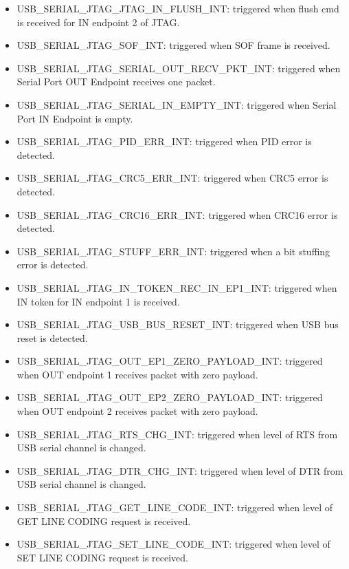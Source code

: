 \documentclass[main\_\_EN.tex]{subfiles}
\begin{document}
\begin{itemize}
    \item \label{int:USBSERIALJTAGJTAGINFLUSHINT}USB\_SERIAL\_JTAG\_JTAG\_IN\_FLUSH\_INT: triggered when flush cmd is received for IN endpoint 2 of JTAG.
    \item \label{int:USBSERIALJTAGSOFINT}USB\_SERIAL\_JTAG\_SOF\_INT: triggered when SOF frame is received.
    \item \label{int:USBSERIALJTAGSERIALOUTRECVPKTINT}USB\_SERIAL\_JTAG\_SERIAL\_OUT\_RECV\_PKT\_INT: triggered when Serial Port OUT Endpoint receives one packet.
    \item \label{int:USBSERIALJTAGSERIALINEMPTYINT}USB\_SERIAL\_JTAG\_SERIAL\_IN\_EMPTY\_INT: triggered when Serial Port IN Endpoint is empty.
    \item \label{int:USBSERIALJTAGPIDERRINT}USB\_SERIAL\_JTAG\_PID\_ERR\_INT: triggered when PID error is detected.
    \item \label{int:USBSERIALJTAGCRC5ERRINT}USB\_SERIAL\_JTAG\_CRC5\_ERR\_INT: triggered when CRC5 error is detected.
    \item \label{int:USBSERIALJTAGCRC16ERRINT}USB\_SERIAL\_JTAG\_CRC16\_ERR\_INT: triggered when CRC16 error is detected.
    \item \label{int:USBSERIALJTAGSTUFFERRINT}USB\_SERIAL\_JTAG\_STUFF\_ERR\_INT: triggered when a bit stuffing error is detected.
    \item \label{int:USBSERIALJTAGINTOKENRECINEP1INT}USB\_SERIAL\_JTAG\_IN\_TOKEN\_REC\_IN\_EP1\_INT: triggered when IN token for IN endpoint 1 is received.
    \item \label{int:USBSERIALJTAGUSBBUSRESETINT}USB\_SERIAL\_JTAG\_USB\_BUS\_RESET\_INT: triggered when USB bus reset is detected.
    \item \label{int:USBSERIALJTAGOUTEP1ZEROPAYLOADINT}USB\_SERIAL\_JTAG\_OUT\_EP1\_ZERO\_PAYLOAD\_INT: triggered when OUT endpoint 1 receives packet with zero payload.
    \item \label{int:USBSERIALJTAGOUTEP2ZEROPAYLOADINT}USB\_SERIAL\_JTAG\_OUT\_EP2\_ZERO\_PAYLOAD\_INT: triggered when OUT endpoint 2 receives packet with zero payload.
    \item \label{int:USBSERIALJTAGRTSCHGINT}USB\_SERIAL\_JTAG\_RTS\_CHG\_INT: triggered when level of RTS from USB serial channel is changed.
    \item \label{int:USBSERIALJTAGDTRCHGINT}USB\_SERIAL\_JTAG\_DTR\_CHG\_INT: triggered when level of DTR from USB serial channel is changed.
    \item \label{int:USBSERIALJTAGGETLINECODEINT}USB\_SERIAL\_JTAG\_GET\_LINE\_CODE\_INT: triggered when level of GET LINE CODING request is received.
    \item \label{int:USBSERIALJTAGSETLINECODEINT}USB\_SERIAL\_JTAG\_SET\_LINE\_CODE\_INT: triggered when level of SET LINE CODING request is received.
\end{itemize}
\end{document}
